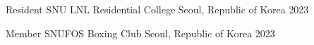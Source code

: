 

\begin{cventries}

  \cventry
    {Resident} %
    {SNU LNL Residential College} %
    {Seoul, Republic of Korea} %
    {2023} %
    {
    }

  \cventry
    {Member} %
    {SNUFOS Boxing Club} %
    {Seoul, Republic of Korea} %
    {2023} %
    {
    }

\end{cventries}
